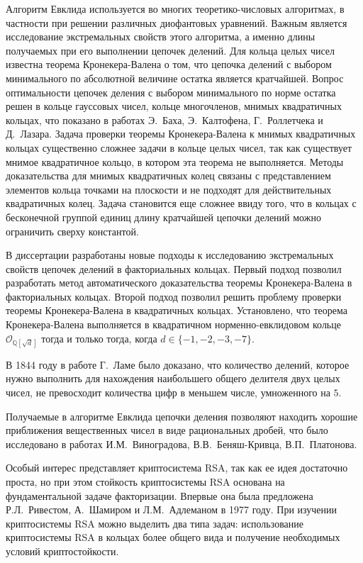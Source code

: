\documentclass[_00_autoref.tex]{subfiles}
\begin{document}
Алгоритм Евклида используется во многих теоретико-числовых алгоритмах, в частности при решении различных диофантовых уравнений.
Важным является исследование экстремальных свойств этого алгоритма, а именно длины получаемых при его выполнении цепочек делений.
Для кольца целых чисел известна теорема Кронекера-Валена о том, что цепочка делений с выбором минимального по абсолютной величине остатка является кратчайшей.
Вопрос оптимальности цепочек деления с выбором минимального по норме остатка решен в кольце гауссовых чисел, кольце многочленов, мнимых квадратичных кольцах, что показано в работах Э.~Баха, Э.~Калтофена, Г.~Роллетчека и Д.~Лазара.
Задача проверки теоремы Кронекера-Валена к мнимых квадратичных кольцах существенно сложнее задачи в кольце целых чисел, так как существует мнимое квадратичное кольцо, в котором эта теорема не выполняется.
Методы доказательства для мнимых квадратичных колец связаны с представлением элементов кольца точками на плоскости и не подходят для действительных квадратичных колец.
Задача становится еще сложнее ввиду того, что в кольцах с бесконечной группой единиц длину кратчайшей цепочки делений можно ограничить сверху константой.

В диссертации разработаны новые подходы к исследованию экстремальных свойств цепочек делений в факториальных кольцах.
Первый подход позволил разработать метод автоматического доказательства теоремы Кронекера-Валена в факториальных кольцах.
Второй подход позволил решить проблему проверки теоремы Кронекера-Валена в квадратичных кольцах.
Установлено, что теорема Кронекера-Валена выполняется в квадратичном норменно-евклидовом кольце $\mathcal{O}_{\mathbb{Q}[\sqrt{d}]}$ тогда и только тогда, когда $d \in \{-1, -2, -3, -7\}$.

В 1844 году в работе Г.~Ламе было доказано, что количество делений, которое нужно выполнить для нахождения наибольшего общего делителя двух целых чисел, не превосходит количества цифр в меньшем числе, умноженного на $5$.

Получаемые в алгоритме Евклида цепочки деления позволяют находить хорошие приближения вещественных чисел в виде рациональных дробей, что было исследовано в работах И.М.~Виноградова,  В.В.~Беняш-Кривца, В.П.~Платонова.

Особый интерес представляет криптосистема RSA, так как ее идея достаточно проста, но при этом стойкость криптосистемы RSA основана на фундаментальной задаче факторизации.
Впервые она была предложена Р.Л.~Ривестом, А.~Шамиром и Л.М.~Адлеманом в 1977 году.
При изучении криптосистемы RSA можно выделить два типа задач: использование криптосистемы RSA в кольцах более общего вида и получение необходимых условий криптостойкости.
\end{document}
